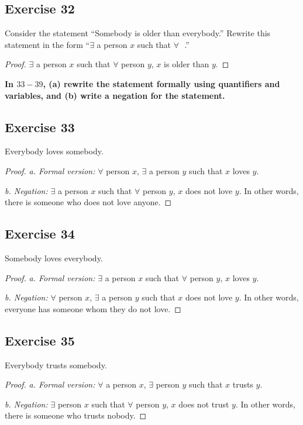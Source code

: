 \documentclass[14pt]{extarticle}
\newcommand{\fbl}{\underline{\hspace{1cm}}\,\,}
\newcommand{\fa}{\forall}
\newcommand{\te}{\exists}
\begin{document}
\subsection{Exercise 32}
Consider the statement “Somebody is older than everybody.” Rewrite this statement in the form “$\te$ a person $x$ such that $\fa$ \fbl.”

\begin{proof}
    $\te$ a person $x$ such that $\fa$ person $y$, $x$ is older than $y$.
\end{proof}

{\bf \color{cyan} In $33-39$, (a) rewrite the statement formally using quantifiers and variables, and (b) write a negation for the statement.}

\subsection{Exercise 33}
Everybody loves somebody.

\begin{proof}
    {\it a. Formal version:} $\fa$ person $x$, $\te$ a person $y$ such that $x$ loves $y$.

        {\it b. Negation:} $\te$ a person $x$ such that $\fa$ person $y$, $x$ does not love $y$. In other words, there is someone who
    does not love anyone.
\end{proof}

\subsection{Exercise 34}
Somebody loves everybody.

\begin{proof}
    {\it a. Formal version:} $\te$ a person $x$ such that $\fa$ person $y$, $x$ loves $y$.

        {\it b. Negation:} $\fa$ person $x$, $\te$ a person $y$ such that $x$ does not love $y$. In other words, everyone has someone whom they do not love.
\end{proof}

\subsection{Exercise 35}
Everybody trusts somebody.

\begin{proof}
    {\it a. Formal version:} $\fa$ a person $x$, $\te$ person $y$ such that $x$ trusts $y$.

        {\it b. Negation:} $\te$ person $x$ such that $\fa$ person $y$, $x$ does not trust $y$. In other words, there is someone who trusts nobody.
\end{proof}
\end{document}
